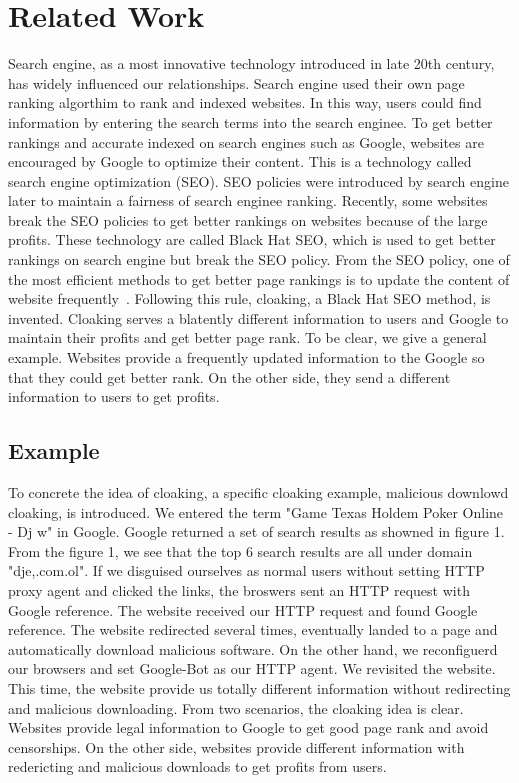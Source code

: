 \section{Related Work}
\label{s:related work}
Search engine, as a most innovative technology  introduced in late 20th century, has widely influenced our relationships. Search engine used their own page ranking algorthim to rank and indexed websites. In this way, users could find information by entering the search terms into the search enginee. To get better rankings and accurate indexed on search engines such as Google, websites are encouraged by Google to optimize their content. This is a technology called search engine optimization (SEO).
SEO policies were introduced by search engine later to maintain a fairness of search enginee ranking. Recently, some websites break the SEO policies to get better rankings on websites because of the large profits. These technology are called Black Hat SEO, which is used to get better rankings on search engine but break the SEO policy.
From the SEO policy, one of the most efficient methods to get better page rankings is to update the content of website frequently~\cite{wang2011cloak}.
Following this rule, cloaking, a Black Hat SEO method, is invented. Cloaking serves a blatently different information to users and Google to maintain their
profits and get better page rank. To be clear, we give a general example. Websites provide a frequently updated information to the Google so that they could get
better rank. On the other side, they send a different information to users to get profits.

\subsection{Example}
To concrete the idea of cloaking, a specific cloaking example, malicious downlowd cloaking, is introduced. We entered the term "Game
Texas Holdem Poker Online - Dj w" in Google. Google returned a set of search results as showned in figure 1.
From the figure 1, we see that the top 6 search results are all under domain "dje,.com.ol". If we disguised ourselves as normal users without setting HTTP proxy 
agent and clicked the links, the broswers sent an HTTP request with Google reference. The website received our HTTP request and found Google reference. The website
redirected several times, eventually landed to a page and automatically download malicious software. On the other hand, we reconfiguerd our browsers and set
Google-Bot as our HTTP agent. We revisited the website. This time, the website provide us totally different information without redirecting and malicious downloading.
From two scenarios, the cloaking idea is clear. Websites provide legal information to Google to get good page rank and avoid censorships. On the other side,
websites provide different information with redericting and malicious downloads to get profits from users. 

